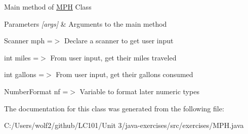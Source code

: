 Main method of \mbox{\hyperlink{classexercises_1_1_m_p_h}{M\+PH}} Class 
\begin{DoxyParams}{Parameters}
{\em \mbox{[}args\mbox{]}} & Arguments to the main method \\
\hline
\end{DoxyParams}
Scanner mph =$>$ Declare a scanner to get user input

int miles =$>$ From user input, get their miles traveled

int gallons =$>$ From user input, get their gallons consumed

Number\+Format nf =$>$ Variable to format later numeric types 

The documentation for this class was generated from the following file\+:\begin{DoxyCompactItemize}
\item 
C\+:/\+Users/wolf2/github/\+L\+C101/\+Unit 3/java-\/exercises/src/exercises/M\+P\+H.\+java\end{DoxyCompactItemize}
